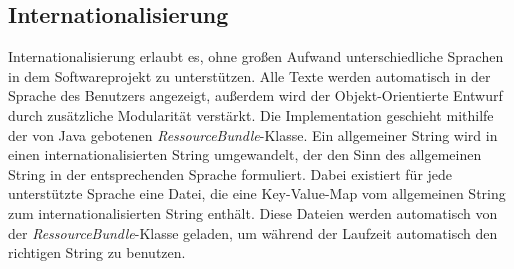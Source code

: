 \documentclass[parskip=full]{scrartcl}
\begin{document}
 \subsection{Internationalisierung}
 	Internationalisierung erlaubt es, ohne großen Aufwand unterschiedliche Sprachen in dem Softwareprojekt zu unterstützen. Alle Texte werden automatisch in der Sprache des Benutzers angezeigt, außerdem wird der Objekt-Orientierte Entwurf durch zusätzliche Modularität verstärkt. Die Implementation geschieht mithilfe der von Java gebotenen \textit{RessourceBundle}-Klasse. Ein allgemeiner String wird in einen internationalisierten String umgewandelt, der den Sinn des allgemeinen String in der entsprechenden Sprache formuliert. Dabei existiert für jede unterstützte Sprache eine Datei, die eine Key-Value-Map vom allgemeinen String zum internationalisierten String enthält. Diese Dateien werden automatisch von der \textit{RessourceBundle}-Klasse geladen, um während der Laufzeit automatisch den richtigen String zu benutzen.
\end{document}
